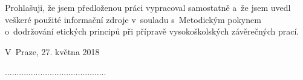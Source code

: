 \begin{declaration}

Prohlašuji, že jsem předloženou práci vypracoval samostatně a~že jsem uvedl veškeré použité informační zdroje v~souladu s~Metodickým pokynem o~dodržování etických principů při přípravě vysokoškolských závěrečných prací.

\medskip

V~Praze, 27. května 2018

\vspace*{.5cm}

...........................................



\end{declaration}
